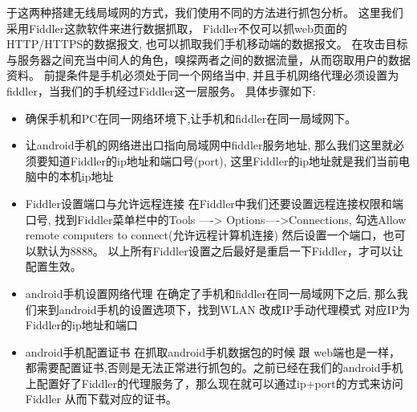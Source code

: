 于这两种搭建无线局域网的方式，我们使用不同的方法进行抓包分析。
这里我们采用Fiddler\cite{crane2015fiddler}这款软件来进行数据抓取， Fiddler不仅可以抓web页面的HTTP/HTTPS的数据报文, 也可以抓取我们手机移动端的数据报文。
在攻击目标与服务器之间充当中间人的角色，嗅探两者之间的数据流量，从而窃取用户的数据资料。
前提条件是手机必须处于同一个网络当中, 并且手机网络代理必须设置为fiddler，当我们的手机经过Fiddler这一层服务。
具体步骤如下:
\begin{itemize}
    \item 确保手机和PC在同一网络环境下,让手机和fiddler在同一局域网下。
    \item 让android手机的网络进出口指向局域网中fiddler服务地址, 那么我们这里就必须要知道Fiddler的ip地址和端口号(port), 这里Fiddler的ip地址就是我们当前电脑中的本机ip地址
    \item Fiddler设置端口与允许远程连接 在Fiddler中我们还要设置远程连接权限和端口号, 找到Fiddler菜单栏中的Tools ----> Options---->Connections, 勾选Allow remote computers to connect(允许远程计算机连接) 然后设置一个端口，也可以默认为8888。 以上所有Fiddler设置之后最好是重启一下Fiddler，才可以让配置生效。
    \item android手机设置网络代理 在确定了手机和fiddler在同一局域网下之后, 那么我们来到android手机的设置选项下，找到WLAN 改成IP手动代理模式 对应IP为Fiddler的ip地址和端口
    \item android手机配置证书 在抓取android手机数据包的时候 跟 web端也是一样，都需要配置证书,否则是无法正常进行抓包的。之前已经在我们的android手机上配置好了Fiddler的代理服务了，那么现在就可以通过ip+port的方式来访问Fiddler 从而下载对应的证书。
\end{itemize}

